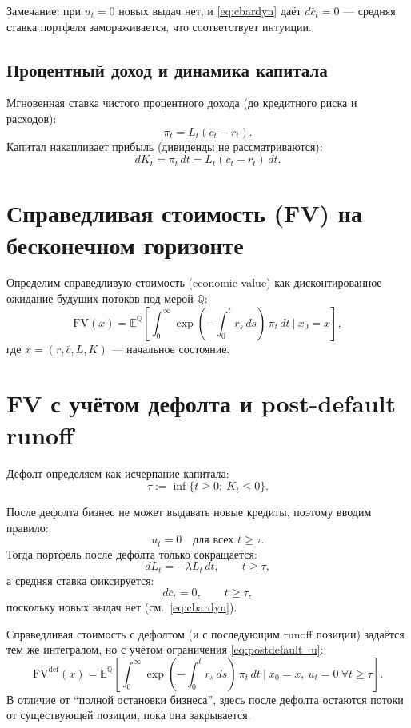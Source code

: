 \documentclass[11pt]{article}
\newcommand{\E}{\mathbb{E}}
\newcommand{\Q}{\mathbb{Q}}
\newcommand{\1}{\mathbf{1}}
\begin{document}
Замечание: при $u_t=0$ новых выдач нет, и \eqref{eq:cbardyn} даёт $d\bar c_t=0$ --- средняя ставка портфеля замораживается, что соответствует интуиции.

\subsection{Процентный доход и динамика капитала}
Мгновенная ставка чистого процентного дохода (до кредитного риска и расходов):
\begin{equation}
\pi_t = L_t(\bar c_t - r_t).
\label{eq:profitrate}
\end{equation}
Капитал накапливает прибыль (дивиденды не рассматриваются):
\begin{equation}
dK_t = \pi_t\,dt = L_t(\bar c_t - r_t)\,dt.
\label{eq:Kdyn}
\end{equation}

\section{Справедливая стоимость (FV) на бесконечном горизонте}
Определим справедливую стоимость (economic value) как дисконтированное ожидание будущих потоков под мерой $\Q$:
\begin{equation}
\mathrm{FV}(x)
=
\E^{\Q}\left[\int_{0}^{\infty}
\exp\!\left(-\int_{0}^{t} r_s\,ds\right)\,
\pi_t\,dt \ \Big|\ x_0=x\right],
\label{eq:FV_inf}
\end{equation}
где $x=(r,\bar c,L,K)$ --- начальное состояние.

\section{FV с учётом дефолта и post-default runoff}
Дефолт определяем как исчерпание капитала:
\begin{equation}
\tau := \inf\{t\ge 0:\ K_t \le 0\}.
\label{eq:tau}
\end{equation}

После дефолта бизнес не может выдавать новые кредиты, поэтому вводим правило:
\begin{equation}
u_t = 0 \quad \text{для всех } t \ge \tau.
\label{eq:postdefault_u}
\end{equation}
Тогда портфель после дефолта только сокращается:
\[
dL_t = -\lambda L_t\,dt,\qquad t\ge\tau,
\]
а средняя ставка фиксируется:
\[
d\bar c_t = 0,\qquad t\ge\tau,
\]
поскольку новых выдач нет (см.\ \eqref{eq:cbardyn}).

Справедливая стоимость с дефолтом (и с последующим runoff позиции) задаётся тем же интегралом, но с учётом ограничения \eqref{eq:postdefault_u}:
\begin{equation}
\mathrm{FV}^{\mathrm{def}}(x)
=
\E^{\Q}\left[\int_{0}^{\infty}
\exp\!\left(-\int_{0}^{t} r_s\,ds\right)\,
\pi_t\,dt \ \Big|\ x_0=x,\ u_t=0\ \forall t\ge\tau\right].
\label{eq:FVdef_inf}
\end{equation}
В отличие от ``полной остановки бизнеса'', здесь после дефолта остаются потоки от существующей позиции, пока она закрывается.
\end{document}
